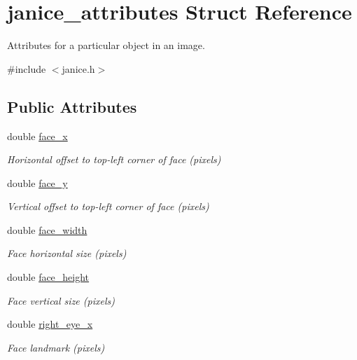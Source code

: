 \hypertarget{structjanice__attributes}{}\section{janice\+\_\+attributes Struct Reference}
\label{structjanice__attributes}


Attributes for a particular object in an image.  




{\ttfamily \#include $<$janice.\+h$>$}

\subsection*{Public Attributes}
\begin{DoxyCompactItemize}
\item 
double \hyperlink{structjanice__attributes_a62f236e140165065156d71a5bebb427b}{face\+\_\+x}
\begin{DoxyCompactList}\small\item\em Horizontal offset to top-\/left corner of face (pixels) \end{DoxyCompactList}\item 
double \hyperlink{structjanice__attributes_a6d1095e735599b4cafb3b28aa674d15a}{face\+\_\+y}
\begin{DoxyCompactList}\small\item\em Vertical offset to top-\/left corner of face (pixels) \end{DoxyCompactList}\item 
double \hyperlink{structjanice__attributes_a52549e9e1e0c09dde986d91787e753ee}{face\+\_\+width}
\begin{DoxyCompactList}\small\item\em Face horizontal size (pixels) \end{DoxyCompactList}\item 
double \hyperlink{structjanice__attributes_ae770b1c0f27c613ac09e7794554caee4}{face\+\_\+height}
\begin{DoxyCompactList}\small\item\em Face vertical size (pixels) \end{DoxyCompactList}\item 
double \hyperlink{structjanice__attributes_aa768b24b50fec357c6b635cc2d8a6625}{right\+\_\+eye\+\_\+x}
\begin{DoxyCompactList}\small\item\em Face landmark (pixels) \end{DoxyCompactList}\item 

\end{DoxyCompactItemize}
